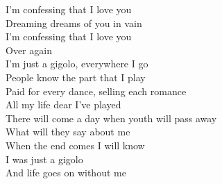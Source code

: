 I'm confessing that I love you \\ 
Dreaming dreams of you in vain \\ 
I'm confessing that I love you \\ 
Over again \\ 

I'm just a gigolo, everywhere I go \\ 
People know the part that I play \\ 
Paid for every dance, selling each romance \\ 
All my life dear I've played \\ 
There will come a day when youth will pass away \\ 
What will they say about me \\ 
When the end comes I will know  \\ 
I was just a gigolo \\ 
And life goes on without me \\ 
